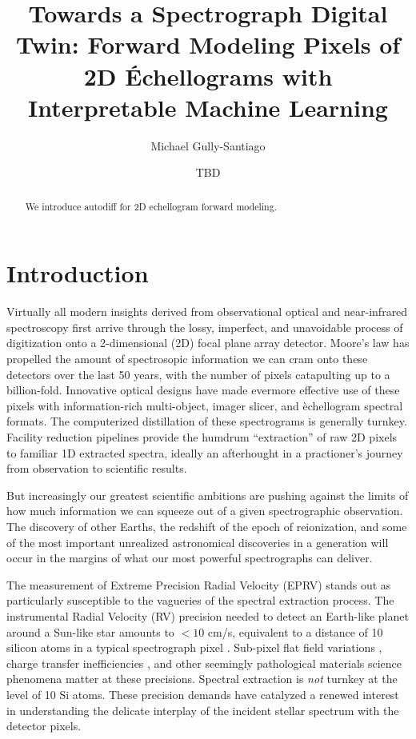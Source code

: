 \documentclass[twocolumn]{aastex631}
\begin{document}
\title{Towards a Spectrograph Digital Twin: Forward Modeling Pixels of 2D \'Echellograms with Interpretable Machine Learning}

\author{Michael Gully-Santiago}

\author{TBD}


\begin{abstract}

  We introduce autodiff for 2D echellogram forward modeling.

\end{abstract}



\section{Introduction}\label{sec:intro}

Virtually all modern insights derived from observational optical and near-infrared spectroscopy first arrive through the lossy, imperfect, and unavoidable process of digitization onto a 2-dimensional (2D) focal plane array detector.  Moore's law has propelled the amount of spectrosopic information we can cram onto these detectors over the last 50 years, with the number of pixels catapulting up to a billion-fold.  Innovative optical designs have made evermore effective use of these pixels with information-rich multi-object, imager slicer, and \`echellogram spectral formats.  The computerized distillation of these spectrograms is generally turnkey.  Facility reduction pipelines provide the humdrum ``extraction'' of raw 2D pixels to familiar 1D extracted spectra, ideally an afterhought in a practioner's journey from observation to scientific results.

But increasingly our greatest scientific ambitions are pushing against the limits of how much information we can squeeze out of a given spectrographic observation.  The discovery of other Earths, the redshift of the epoch of reionization, and some of the most important unrealized astronomical discoveries in a generation will occur in the margins of what our most powerful spectrographs can deliver.

The measurement of Extreme Precision Radial Velocity (EPRV) stands out as particularly susceptible to the vagueries of the spectral extraction process.  The instrumental Radial Velocity (RV) precision needed to detect an Earth-like planet around a Sun-like star amounts to $<10$ cm/s, equivalent to a distance of 10 silicon atoms in a typical spectrograph pixel \citep{2014SPIE.9147E..1GM}.  Sub-pixel flat field variations \citep{2018SPIE10698E..5JV}, charge transfer inefficiencies \citep{2020SPIE11454E..0SA}, and other seemingly pathological materials science phenomena matter at these precisions.  Spectral extraction is \emph{not} turnkey at the level of 10 Si atoms.  These precision demands have catalyzed a renewed interest in understanding the delicate interplay of the incident stellar spectrum with the detector pixels.
\end{document}
